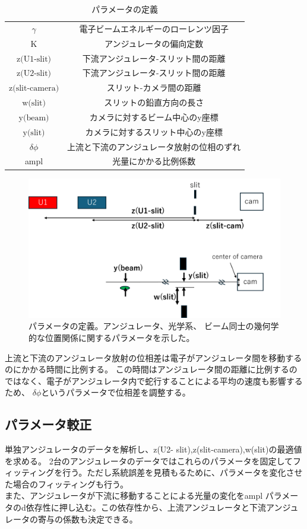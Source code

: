 \documentclass[a4paper,11pt,uplatex]{jsbook}
\begin{document}
\begin{table}[h]
\centering
\begin{tabular}{c|c}
  $\gamma$ & 電子ビームエネルギーのローレンツ因子 \\
  $\text{K}$ & アンジュレータの偏向定数 \\
  $\text{z(U1-slit)}$ & 下流アンジュレータ-スリット間の距離\\
  $\text{z(U2-slit)}$ & 下流アンジュレータ-スリット間の距離 \\
  $\text{z(slit-camera)}$ & スリット-カメラ間の距離 \\
  $\text{w(slit)}$ & スリットの鉛直方向の長さ \\
  $\text{y(beam)}$ & カメラに対するビーム中心のy座標 \\
  $\text{y(slit)}$ & カメラに対するスリット中心のy座標 \\
  $\delta \phi$ & 上流と下流のアンジュレータ放射の位相のずれ\\
  ampl & 光量にかかる比例係数
\end{tabular}
\caption[パラメータの定義]{パラメータの定義}\label{tab:prm}
\end{table}
\begin{figure}[h]
  \centering
  \includegraphics[width=0.8\linewidth]{image/4-prm.png}
  \caption[パラメータの定義]{パラメータの定義。アンジュレータ、光学系、
  ビーム同士の幾何学的な位置関係に関するパラメータを示した。}\label{prm}
\end{figure}
上流と下流のアンジュレータ放射の位相差は電子がアンジュレータ間を移動するのにかかる時間に比例する。
この時間はアンジュレータ間の距離に比例するのではなく、電子がアンジュレータ内で蛇行することによる平均の速度も影響するため、
$\delta \phi$というパラメータで位相差を調整する。


\subsection{パラメータ較正}
単独アンジュレータのデータを解析し、z(U2- slit),z(slit-camera),w(slit)の最適値を求める。
2台のアンジュレータのデータではこれらのパラメータを固定してフィッティングを行う。ただし系統誤差を見積もるために、パラメータを変化させた場合のフィッティングも行う。\\
また、アンジュレータが下流に移動することによる光量の変化をampl パラメータのd依存性に押し込む。この依存性から、上流アンジュレータと下流アンジュレータの寄与の係数も決定できる。
\end{document}
